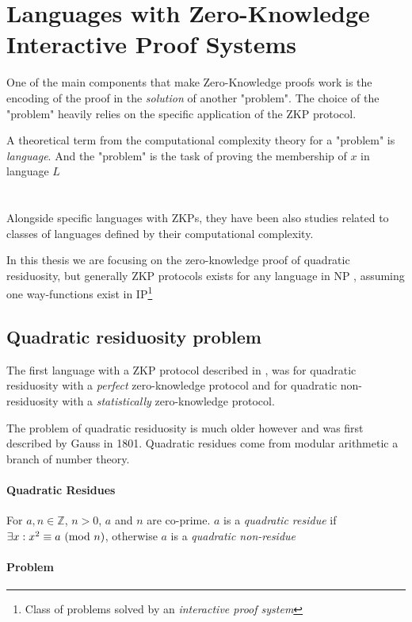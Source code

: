 \section{Languages with Zero-Knowledge Interactive Proof Systems}

One of the main components that make Zero-Knowledge proofs work is the encoding of the proof in the \textit{solution} of another "problem". The choice of the "problem" heavily relies on the specific application of the ZKP protocol.

A theoretical term from the computational complexity theory for a "problem" is \textit{language}. And the "problem" is the task of proving the membership of $x$ in language $L$
\\
\\
\\
Alongside specific languages with ZKPs, they have been also studies related to classes of languages defined by their computational complexity.

In this thesis we are focusing on the zero-knowledge proof of quadratic residuosity, but generally ZKP protocols exists for any language in NP \cite{GMW}, assuming one way-functions exist in IP\footnote{Class of problems solved by an \textit{interactive proof system}}

\subsection{Quadratic residuosity problem}

The first language with a ZKP protocol described in \cite{GMR}, was for quadratic residuosity with a \textit{perfect} zero-knowledge protocol and for quadratic non-residuosity with a \textit{statistically} zero-knowledge protocol.

\bigskip

The problem of quadratic residuosity is much older however and was first described by Gauss in 1801. 	
Quadratic residues come from modular arithmetic a branch of number theory.


\paragraph{Quadratic Residues}

For $a, n \in \mathbb{Z}$, $n > 0$, $a$ and $n$ are co-prime.
$a$ is a \textit{quadratic residue} if  $\exists x:x^2 \equiv a \ (\mathrm{mod}\ n)$, otherwise $a$ is a \textit{quadratic non-residue}

\paragraph{Problem}

